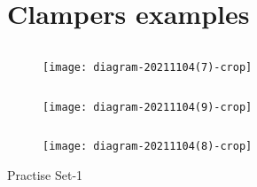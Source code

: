 \section{Clampers examples}
\begin{example}$\left. \right. $\\
	\begin{figure}[H]
		\centering
		\texttt{[image: diagram-20211104(7)-crop]}
	\end{figure}
\end{example}
 
\begin{example}$\left. \right. $\\
\begin{figure}[H]
\centering
\texttt{[image: diagram-20211104(9)-crop]}
\end{figure}
\end{example}
\begin{example}$\left. \right. $\\
\begin{figure}[H]
\centering
\texttt{[image: diagram-20211104(8)-crop]}
\end{figure}
\end{example}
\newpage
\begin{abox}
	Practise Set-1
\end{abox}
